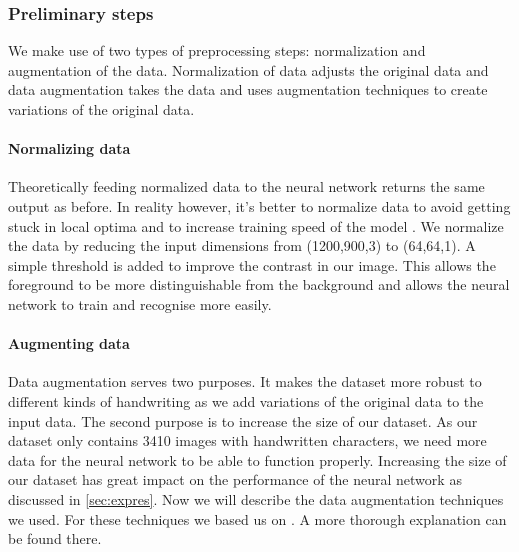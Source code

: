 \documentclass{article}
\begin{document}
\subsubsection{Preliminary steps}
\label{sec:preproc}
We make use of two types of preprocessing steps: normalization and augmentation of the data. Normalization of data adjusts the original data and data augmentation takes the data and uses augmentation techniques to create variations of the original data.

\paragraph{Normalizing data} 
\label{par:norm}
Theoretically feeding normalized data to the neural network returns the same output as before. 
In reality however, it's better to normalize data to avoid getting stuck in local optima and to increase training speed of the model \cite{NormGoal}.
We normalize the data by reducing the input dimensions from (1200,900,3) to (64,64,1). A simple threshold is added to improve the contrast in our image. 
This allows the foreground to be more distinguishable from the background and allows the neural network to train and recognise more easily. 

\paragraph{Augmenting data}
\label{par:aug}
Data augmentation serves two purposes. It makes the dataset more robust to different kinds of handwriting as we add variations of the original data to the input data. 
The second purpose is to increase the size of our dataset. As our dataset only contains 3410 images with handwritten characters, we need more data for the neural network to be able to function properly. 
Increasing the size of our dataset has great impact on the performance of the neural network as discussed in \ref{sec:expres}. Now we will describe the data augmentation techniques we used. For these techniques we based us on \cite{DataAug}. A more thorough explanation can be found there. 
\end{document}
